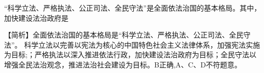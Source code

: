 \question ``科学立法、严格执法、公正司法、全民守法''是全面依法治国的基本格局。其中，加快建设法治政府是
\par{}
\begin{solution}【简析】全面依法治国的基本格局是``科学立法、严格执法、公正司法、全民守法''。
科学立法以完善以宪法为核心的中国特色社会主义法律体系，加强宪法实施为目标;；严格执法以深入推进依法行政，加快建设法治政府为目标；全民守法以增强全民法治观念，推进法治社会建设为目标。B正确,A、C、D不符题意。
\end{solution}
